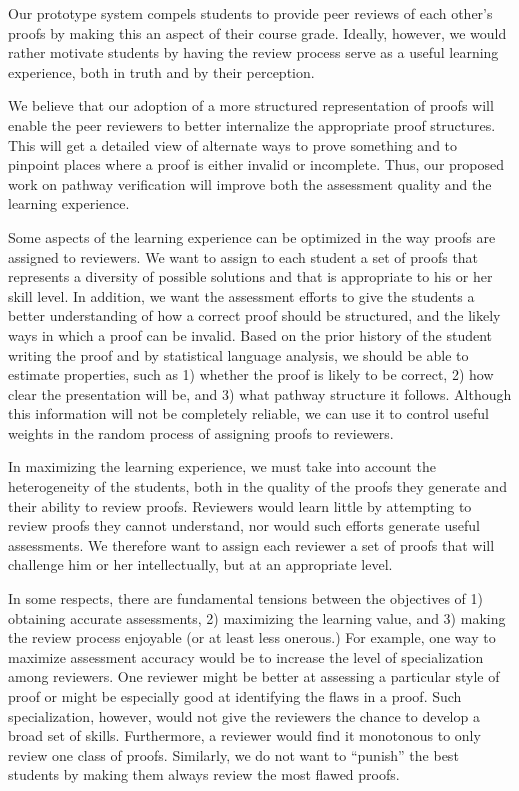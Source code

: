 \documentclass[12pt]{article}
\begin{document}
Our prototype system compels students to provide peer reviews of each
other's proofs by making this an aspect of their course grade.
Ideally, however, we would
rather motivate students by having the review process serve as a useful
learning experience, both in truth and by their perception.

We believe that our adoption of a more structured representation of
proofs will enable the peer reviewers to better internalize the
appropriate proof structures.  This will get a detailed view of
alternate ways to prove something and to pinpoint places where a proof
is either invalid or incomplete.  Thus, our proposed work on pathway
verification will improve both the assessment quality and the learning
experience. 

Some aspects of the learning experience can be optimized in the way
proofs are assigned to reviewers.  We want to assign to each student
a set of proofs that represents a diversity of possible solutions and
that is appropriate to his or her skill level.  In addition, we want
the assessment efforts to give the students a better understanding of
how a correct proof should be structured, and the likely ways in which
a proof can be invalid.
Based on the
prior history of the student writing the proof and by statistical
language analysis, we should be able to estimate properties, such as
1) whether the proof is likely to be correct, 2) how clear the presentation
will be, and 3) what pathway structure it follows.  Although this
information will not be completely reliable, we can use it to control
useful weights in the random process of assigning proofs to reviewers.

In maximizing the learning experience, we must take into account the
heterogeneity of the students, both in the quality of the proofs they
generate and their ability to review proofs.  Reviewers would learn
little by attempting to review proofs they cannot understand, nor
would such efforts generate useful assessments.  We therefore want to
assign each reviewer a set of proofs that will challenge him or her
intellectually, but at an appropriate level.

In some respects, there are fundamental tensions between the
objectives of 1) obtaining accurate assessments, 2) maximizing the
learning value, and 3) making the review process enjoyable (or at
least less onerous.)  For example, one way to maximize assessment
accuracy would be to increase the level of specialization among
reviewers.  One reviewer might be better at assessing a particular
style of proof or might be especially good at identifying the flaws in
a proof.  Such specialization, however, would not give the reviewers
the chance to develop a broad set of skills.  Furthermore, a reviewer
would find it monotonous to only review one class of proofs.
Similarly, we do not want to ``punish'' the best students by making
them always review the most flawed proofs.
\end{document}
